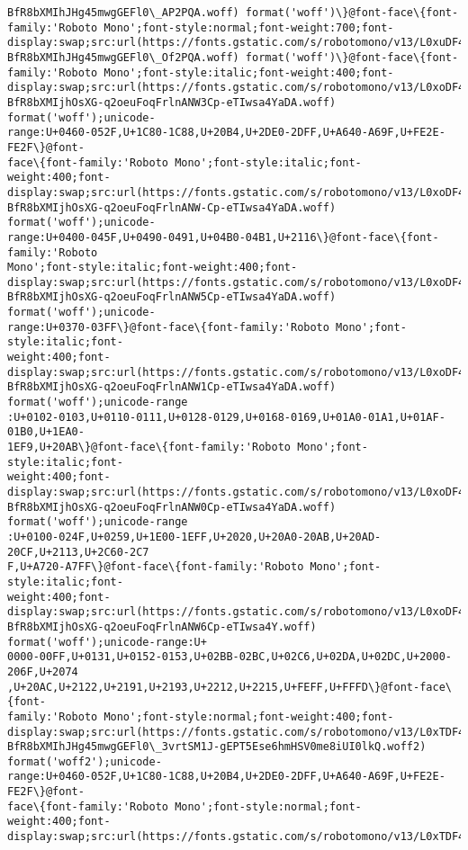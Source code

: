 \documentclass[11pt]{article}
\begin{document}
\begin{Verbatim}[commandchars=\\\{\}]
BfR8bXMIhJHg45mwgGEFl0\_AP2PQA.woff) format('woff')\}@font-face\{font-
family:'Roboto Mono';font-style:normal;font-weight:700;font-
display:swap;src:url(https://fonts.gstatic.com/s/robotomono/v13/L0xuDF4xlVMF-
BfR8bXMIhJHg45mwgGEFl0\_Of2PQA.woff) format('woff')\}@font-face\{font-
family:'Roboto Mono';font-style:italic;font-weight:400;font-
display:swap;src:url(https://fonts.gstatic.com/s/robotomono/v13/L0xoDF4xlVMF-
BfR8bXMIjhOsXG-q2oeuFoqFrlnANW3Cp-eTIwsa4YaDA.woff) format('woff');unicode-
range:U+0460-052F,U+1C80-1C88,U+20B4,U+2DE0-2DFF,U+A640-A69F,U+FE2E-FE2F\}@font-
face\{font-family:'Roboto Mono';font-style:italic;font-weight:400;font-
display:swap;src:url(https://fonts.gstatic.com/s/robotomono/v13/L0xoDF4xlVMF-
BfR8bXMIjhOsXG-q2oeuFoqFrlnANW-Cp-eTIwsa4YaDA.woff) format('woff');unicode-
range:U+0400-045F,U+0490-0491,U+04B0-04B1,U+2116\}@font-face\{font-family:'Roboto
Mono';font-style:italic;font-weight:400;font-
display:swap;src:url(https://fonts.gstatic.com/s/robotomono/v13/L0xoDF4xlVMF-
BfR8bXMIjhOsXG-q2oeuFoqFrlnANW5Cp-eTIwsa4YaDA.woff) format('woff');unicode-
range:U+0370-03FF\}@font-face\{font-family:'Roboto Mono';font-style:italic;font-
weight:400;font-
display:swap;src:url(https://fonts.gstatic.com/s/robotomono/v13/L0xoDF4xlVMF-
BfR8bXMIjhOsXG-q2oeuFoqFrlnANW1Cp-eTIwsa4YaDA.woff) format('woff');unicode-range
:U+0102-0103,U+0110-0111,U+0128-0129,U+0168-0169,U+01A0-01A1,U+01AF-01B0,U+1EA0-
1EF9,U+20AB\}@font-face\{font-family:'Roboto Mono';font-style:italic;font-
weight:400;font-
display:swap;src:url(https://fonts.gstatic.com/s/robotomono/v13/L0xoDF4xlVMF-
BfR8bXMIjhOsXG-q2oeuFoqFrlnANW0Cp-eTIwsa4YaDA.woff) format('woff');unicode-range
:U+0100-024F,U+0259,U+1E00-1EFF,U+2020,U+20A0-20AB,U+20AD-20CF,U+2113,U+2C60-2C7
F,U+A720-A7FF\}@font-face\{font-family:'Roboto Mono';font-style:italic;font-
weight:400;font-
display:swap;src:url(https://fonts.gstatic.com/s/robotomono/v13/L0xoDF4xlVMF-
BfR8bXMIjhOsXG-q2oeuFoqFrlnANW6Cp-eTIwsa4Y.woff) format('woff');unicode-range:U+
0000-00FF,U+0131,U+0152-0153,U+02BB-02BC,U+02C6,U+02DA,U+02DC,U+2000-206F,U+2074
,U+20AC,U+2122,U+2191,U+2193,U+2212,U+2215,U+FEFF,U+FFFD\}@font-face\{font-
family:'Roboto Mono';font-style:normal;font-weight:400;font-
display:swap;src:url(https://fonts.gstatic.com/s/robotomono/v13/L0xTDF4xlVMF-
BfR8bXMIhJHg45mwgGEFl0\_3vrtSM1J-gEPT5Ese6hmHSV0me8iUI0lkQ.woff2)
format('woff2');unicode-
range:U+0460-052F,U+1C80-1C88,U+20B4,U+2DE0-2DFF,U+A640-A69F,U+FE2E-FE2F\}@font-
face\{font-family:'Roboto Mono';font-style:normal;font-weight:400;font-
display:swap;src:url(https://fonts.gstatic.com/s/robotomono/v13/L0xTDF4xlVMF-

\end{Verbatim}
\end{document}
